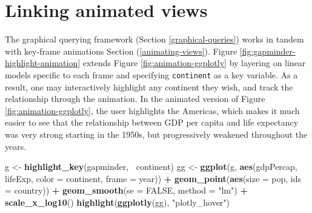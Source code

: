 \documentclass[
  12pt,
]{krantz}
\newenvironment{Shaded}{\begin{snugshade}}{\end{snugshade}}
\newcommand{\DataTypeTok}[1]{\textcolor[rgb]{0.13,0.29,0.53}{#1}}
\newcommand{\KeywordTok}[1]{\textcolor[rgb]{0.13,0.29,0.53}{\textbf{#1}}}
\newcommand{\NormalTok}[1]{#1}
\newcommand{\OperatorTok}[1]{\textcolor[rgb]{0.81,0.36,0.00}{\textbf{#1}}}
\newcommand{\OtherTok}[1]{\textcolor[rgb]{0.56,0.35,0.01}{#1}}
\newcommand{\StringTok}[1]{\textcolor[rgb]{0.31,0.60,0.02}{#1}}
\begin{document}
\hypertarget{linking-animated-views}{%
\section{Linking animated views}\label{linking-animated-views}}

The graphical querying framework (Section \ref{graphical-queries}) works in tandem with key-frame animations Section (\ref{animating-views}). Figure \ref{fig:gapminder-highlight-animation} extends Figure \ref{fig:animation-ggplotly} by layering on linear models specific to each frame and specifying \texttt{continent} as a key variable. As a result, one may interactively highlight any continent they wish, and track the relationship through the animation. In the animated version of Figure \ref{fig:animation-ggplotly}, the user highlights the Americas, which makes it much easier to see that the relationship between GDP per capita and life expectancy was very strong starting in the 1950s, but progressively weakened throughout the years.

\begin{Shaded}
\begin{Highlighting}[]
\NormalTok{g <-}\StringTok{ }\KeywordTok{highlight_key}\NormalTok{(gapminder, }\OperatorTok{~}\NormalTok{continent)}
\NormalTok{gg <-}\StringTok{ }\KeywordTok{ggplot}\NormalTok{(g, }\KeywordTok{aes}\NormalTok{(gdpPercap, lifeExp, }
  \DataTypeTok{color =}\NormalTok{ continent, }\DataTypeTok{frame =}\NormalTok{ year)) }\OperatorTok{+}
\StringTok{  }\KeywordTok{geom_point}\NormalTok{(}\KeywordTok{aes}\NormalTok{(}\DataTypeTok{size =}\NormalTok{ pop, }\DataTypeTok{ids =}\NormalTok{ country)) }\OperatorTok{+}
\StringTok{  }\KeywordTok{geom_smooth}\NormalTok{(}\DataTypeTok{se =} \OtherTok{FALSE}\NormalTok{, }\DataTypeTok{method =} \StringTok{"lm"}\NormalTok{) }\OperatorTok{+}
\StringTok{  }\KeywordTok{scale_x_log10}\NormalTok{()}
\KeywordTok{highlight}\NormalTok{(}\KeywordTok{ggplotly}\NormalTok{(gg), }\StringTok{"plotly_hover"}\NormalTok{)}
\end{Highlighting}
\end{Shaded}
\end{document}

